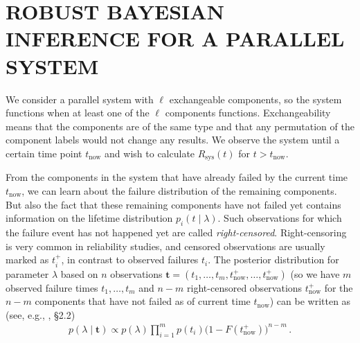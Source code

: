 \documentclass[12pt,a4paper,twocolumn,fleqn]{narms}
\renewcommand{\vec}[1]{{\bm#1}}
\begin{document}
\section{ROBUST BAYESIAN INFERENCE FOR A PARALLEL SYSTEM}
\label{sec:andrewsresults}

We consider a parallel system with $\ell$ exchangeable components,
so the system functions when at least one of the $\ell$ components functions.
Exchangeability means that the components are of the same type
and that any permutation of the component labels would not change any results.
We observe the system until a certain time point $t_\text{now}$
and wish to calculate $R_\text{sys}(t)$ for $t > t_\text{now}$.

From the components in the system that have already failed by the current time $t_\text{now}$,
we can learn about the failure distribution of the remaining components.
But also the fact that these remaining components have not failed yet
contains information on the lifetime distribution $p_i(t\mid \lambda)$.
Such observations for which the failure event has not happened yet are called \emph{right-censored}.
Right-censoring is very common in reliability studies,
and censored observations are usually marked as $t_i^+$, in contrast to observed failures $t_i$.
The posterior distribution for parameter $\lambda$
based on $n$ observations $\vec{t} = (t_1,\ldots,t_m,t^+_\text{now},\ldots,t^+_\text{now})$
(so we have $m$ observed failure times $t_1,\ldots,t_m$
and $n-m$ right-censored observations $t^+_\text{now}$ for the $n-m$ components that have not failed as of current time $t_\text{now}$)
can be written as (see, e.g., , \S 2.2)
\begin{align}
p(\lambda \mid \vec{t}) \propto p(\lambda) \prod_{i=1}^m p(t_i) \big(1-F(t^+_\text{now})\big)^{n-m}\,.
\end{align}
\end{document}
